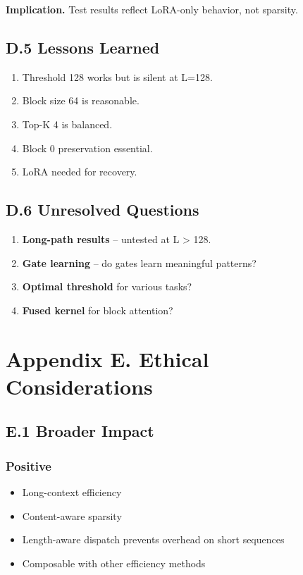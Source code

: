 \textbf{Implication.} Test results reflect LoRA-only behavior, not sparsity.

\subsection{D.5 Lessons Learned}

\begin{enumerate}
\item Threshold 128 works but is silent at L=128.
\item Block size 64 is reasonable.
\item Top-K 4 is balanced.
\item Block 0 preservation essential.
\item LoRA needed for recovery.

\end{enumerate}
\subsection{D.6 Unresolved Questions}

\begin{enumerate}
\item \textbf{Long-path results} -- untested at L \textgreater{} 128.
\item \textbf{Gate learning} -- do gates learn meaningful patterns?
\item \textbf{Optimal threshold} for various tasks?
\item \textbf{Fused kernel} for block attention?

\end{enumerate}


\section{Appendix E. Ethical Considerations}

\subsection{E.1 Broader Impact}

\subsubsection{Positive}
\begin{itemize}
\item Long-context efficiency
\item Content-aware sparsity
\item Length-aware dispatch prevents overhead on short sequences
\item Composable with other efficiency methods

\end{itemize}
